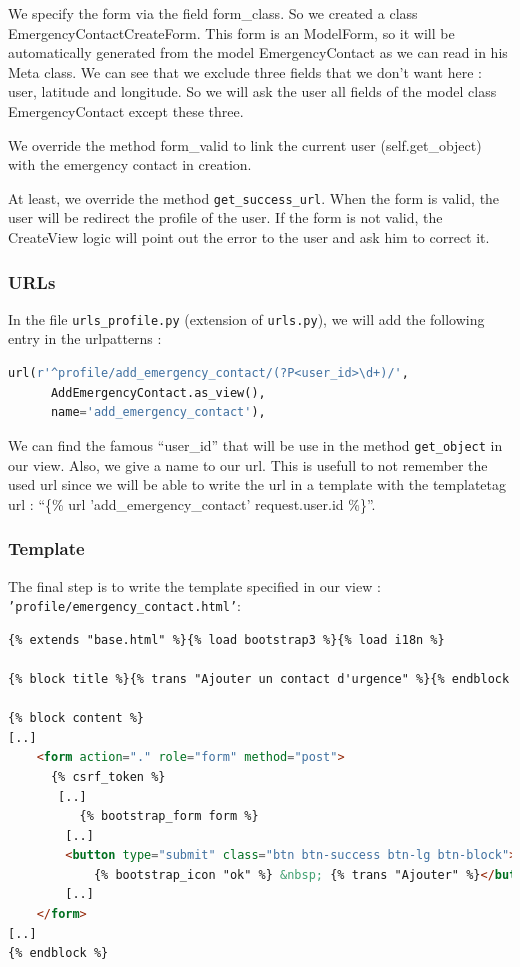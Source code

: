 \documentclass[11pt, a4paper]{article}      %
\begin{document}
We specify the form via the field form\_class. So we created a class EmergencyContactCreateForm. This form is an ModelForm, so it will be automatically generated from the model EmergencyContact as we can read in his Meta class. We can see that we exclude three fields that we don't want here : user, latitude and longitude. So we will ask the user all fields of the model class EmergencyContact except these three.

We override the method form\_valid to link the current user (self.get\_object) with the emergency contact in creation.

At least, we override the method \texttt{get\_success\_url}. When the form is valid, the user will be redirect the profile of the user. If the form is not valid, the CreateView logic will point out the error to the user and ask him to correct it.

\subsubsection{URLs}

In the file \texttt{urls\_profile.py} (extension of \texttt{urls.py}), we will add the following entry in the urlpatterns :

\begin{lstlisting}[language=Python, basicstyle=\footnotesize]
  url(r'^profile/add_emergency_contact/(?P<user_id>\d+)/',
      AddEmergencyContact.as_view(),
      name='add_emergency_contact'), 
\end{lstlisting}

We can find the famous ``user\_id'' that will be use in the method \texttt{get\_object} in our view. Also, we give a name to our url. This is usefull to not remember the used url since we will be able to write the url in a template with the templatetag url : ``\{\% url 'add\_emergency\_contact' request.user.id \%\}''.

\subsubsection{Template}

The final step is to write the template specified in our view : \texttt{'profile/emergency\_contact.html'}:

\begin{lstlisting}[language=HTML, basicstyle=\footnotesize]
{% extends "base.html" %}{% load bootstrap3 %}{% load i18n %}

{% block title %}{% trans "Ajouter un contact d'urgence" %}{% endblock %}

{% block content %}
[..]
    <form action="." role="form" method="post">
      {% csrf_token %}
       [..]
          {% bootstrap_form form %}
        [..]
        <button type="submit" class="btn btn-success btn-lg btn-block">
            {% bootstrap_icon "ok" %} &nbsp; {% trans "Ajouter" %}</button>
        [..]
    </form>
[..]
{% endblock %}
\end{lstlisting}
\end{document}
